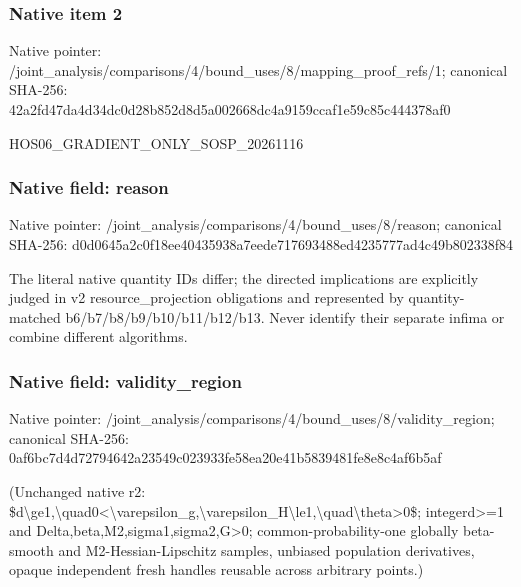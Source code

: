 \documentclass[10pt,a4paper]{article}
\begin{document}
\subsubsection{Native item 2}
Native pointer: /joint\_\allowbreak{}analysis/comparisons/4/bound\_\allowbreak{}uses/8/mapping\_\allowbreak{}proof\_\allowbreak{}refs/1; canonical SHA-256: 42a2fd47da4d34dc0d28b852d8d5a002668dc4a9159ccaf1e59c85c444378af0

\begingroup\raggedright\sloppy HOS06\_\allowbreak{}GRADIENT\_\allowbreak{}ONLY\_\allowbreak{}SOSP\_\allowbreak{}20261116\par\endgroup

\subsubsection{Native field: reason}
Native pointer: /joint\_\allowbreak{}analysis/comparisons/4/bound\_\allowbreak{}uses/8/reason; canonical SHA-256: d0d0645a2c0f18ee40435938a7eede717693488ed4235777ad4c49b802338f84

\begingroup\raggedright\sloppy The literal native quantity IDs differ;\allowbreak{} the directed implications are explicitly judged in v2 resource\_\allowbreak{}projection obligations and represented by quantity-matched b6/\allowbreak{}b7/\allowbreak{}b8/\allowbreak{}b9/\allowbreak{}b10/\allowbreak{}b11/\allowbreak{}b12/\allowbreak{}b13. Never identify their separate infima or combine different algorithms.\par\endgroup

\subsubsection{Native field: validity\_\allowbreak{}region}
Native pointer: /joint\_\allowbreak{}analysis/comparisons/4/bound\_\allowbreak{}uses/8/validity\_\allowbreak{}region; canonical SHA-256: 0af6bc7d4d72794642a23549c023933fe58ea20e41b5839481fe8e8c4af6b5af

\begingroup\raggedright\sloppy (Unchanged native r2:\allowbreak{} \$d\textbackslash{}ge1,\allowbreak{}\textbackslash{}quad0<\textbackslash{}varepsilon\_\allowbreak{}g,\allowbreak{}\textbackslash{}varepsilon\_\allowbreak{}H\textbackslash{}le1,\allowbreak{}\textbackslash{}quad\textbackslash{}theta>0\$;\allowbreak{} integerd>=\allowbreak{}1 and Delta,\allowbreak{}beta,\allowbreak{}M2,\allowbreak{}sigma1,\allowbreak{}sigma2,\allowbreak{}G>0;\allowbreak{} common-probability-one globally beta-smooth and M2-Hessian-Lipschitz samples,\allowbreak{} unbiased population derivatives,\allowbreak{} opaque independent fresh handles reusable across arbitrary points.)\par\endgroup
\end{document}
